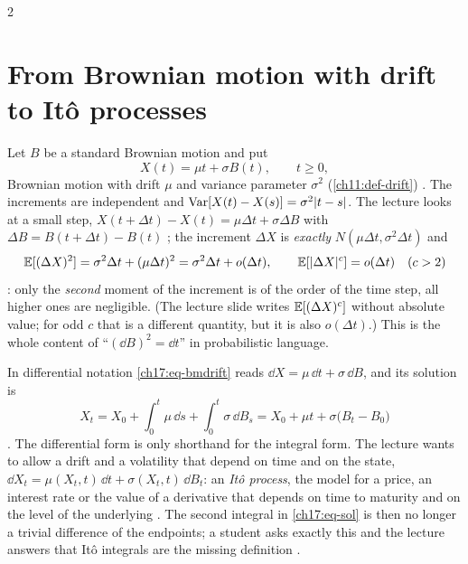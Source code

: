 \begin{paracol}{2}
\section{From Brownian motion with drift to It\^o processes}\label{ch17:sec-drift}

Let $B$ be a standard Brownian motion and put
\begin{equation}\label{ch17:eq-bmdrift}
  X(t)=\mu t+\sigma B(t),\qquad t\ge0,
\end{equation}
Brownian motion with drift $\mu$ and variance parameter $\sigma^2$ (\cref{ch11:def-drift}) .
The increments are independent and $\operatorname{Var}[X(t)-X(s)]=\sigma^2|t-s|$. The lecture looks at a small step,
$X(t+\Delta t)-X(t)=\mu\Delta t+\sigma\Delta B$ with $\Delta B=B(t+\Delta t)-B(t)$ ; the increment
$\Delta X$ is \emph{exactly} $N(\mu\Delta t,\sigma^2\Delta t)$ and
\begin{equation}\label{ch17:eq-onestep}
  \mathbb{E}[(\Delta X)^2]=\sigma^2\Delta t+(\mu\Delta t)^2=\sigma^2\Delta t+o(\Delta t),\qquad
  \mathbb{E}[|\Delta X|^c]=o(\Delta t)\quad(c>2)
\end{equation}
: only the \emph{second} moment of the increment is of the order of the time step, all higher
ones are negligible. (The lecture slide writes $\mathbb{E}[(\Delta X)^c]$ without absolute value; for odd $c$ that is a different
quantity, but it is also $o(\Delta t)$.) This is the whole content of ``$(\dd B)^2=\dd t$'' in probabilistic language.

In differential notation \eqref{ch17:eq-bmdrift} reads $\dd X=\mu\,\dd t+\sigma\,\dd B$, and its solution is
\begin{equation}\label{ch17:eq-sol}
  X_t=X_0+\int_0^t\mu\,\dd s+\int_0^t\sigma\,\dd B_s=X_0+\mu t+\sigma\bigl(B_t-B_0\bigr)
\end{equation}
. The differential form is only shorthand for the integral form. The lecture
wants to allow a drift and a volatility that depend on time and on the state,
$\dd X_t=\mu(X_t,t)\,\dd t+\sigma(X_t,t)\,\dd B_t$: an \emph{It\^o process}, the model for a price, an interest rate or the value of a derivative
that depends on time to maturity and on the level of the underlying . The second integral
in \eqref{ch17:eq-sol} is then no longer a trivial difference of the endpoints; a student asks exactly this and the lecture answers that
It\^o integrals are the missing definition .


\end{paracol}
